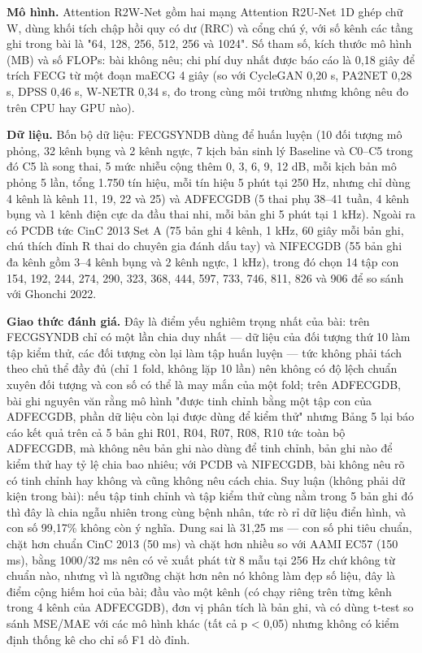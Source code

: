 \documentclass[12pt,a4paper]{article}
\begin{document}
\noindent \textbf{Mô hình.} Attention R2W-Net gồm hai mạng Attention R2U-Net 1D ghép chữ W, dùng khối tích chập hồi quy có dư (RRC) và cổng chú ý, với số kênh các tầng ghi trong bài là "64, 128, 256, 512, 256 và 1024". Số tham số, kích thước mô hình (MB) và số FLOPs: bài không nêu; chi phí duy nhất được báo cáo là 0,18 giây để trích FECG từ một đoạn maECG 4 giây (so với CycleGAN 0,20 s, PA2NET 0,28 s, DPSS 0,46 s, W-NETR 0,34 s, đo trong cùng môi trường nhưng không nêu đo trên CPU hay GPU nào).\par\vspace{3pt}
\noindent \textbf{Dữ liệu.} Bốn bộ dữ liệu: FECGSYNDB dùng để huấn luyện (10 đối tượng mô phỏng, 32 kênh bụng và 2 kênh ngực, 7 kịch bản sinh lý Baseline và C0–C5 trong đó C5 là song thai, 5 mức nhiễu cộng thêm 0, 3, 6, 9, 12 dB, mỗi kịch bản mô phỏng 5 lần, tổng 1.750 tín hiệu, mỗi tín hiệu 5 phút tại 250 Hz, nhưng chỉ dùng 4 kênh là kênh 11, 19, 22 và 25) và ADFECGDB (5 thai phụ 38–41 tuần, 4 kênh bụng và 1 kênh điện cực da đầu thai nhi, mỗi bản ghi 5 phút tại 1 kHz). Ngoài ra có PCDB tức CinC 2013 Set A (75 bản ghi 4 kênh, 1 kHz, 60 giây mỗi bản ghi, chú thích đỉnh R thai do chuyên gia đánh dấu tay) và NIFECGDB (55 bản ghi đa kênh gồm 3–4 kênh bụng và 2 kênh ngực, 1 kHz), trong đó chọn 14 tập con 154, 192, 244, 274, 290, 323, 368, 444, 597, 733, 746, 811, 826 và 906 để so sánh với Ghonchi 2022.\par\vspace{3pt}
\noindent \textbf{Giao thức đánh giá.} Đây là điểm yếu nghiêm trọng nhất của bài: trên FECGSYNDB chỉ có một lần chia duy nhất — dữ liệu của đối tượng thứ 10 làm tập kiểm thử, các đối tượng còn lại làm tập huấn luyện — tức không phải tách theo chủ thể đầy đủ (chỉ 1 fold, không lặp 10 lần) nên không có độ lệch chuẩn xuyên đối tượng và con số có thể là may mắn của một fold; trên ADFECGDB, bài ghi nguyên văn rằng mô hình "được tinh chỉnh bằng một tập con của ADFECGDB, phần dữ liệu còn lại được dùng để kiểm thử" nhưng Bảng 5 lại báo cáo kết quả trên cả 5 bản ghi R01, R04, R07, R08, R10 tức toàn bộ ADFECGDB, mà không nêu bản ghi nào dùng để tinh chỉnh, bản ghi nào để kiểm thử hay tỷ lệ chia bao nhiêu; với PCDB và NIFECGDB, bài không nêu rõ có tinh chỉnh hay không và cũng không nêu cách chia. Suy luận (không phải dữ kiện trong bài): nếu tập tinh chỉnh và tập kiểm thử cùng nằm trong 5 bản ghi đó thì đây là chia ngẫu nhiên trong cùng bệnh nhân, tức rò rỉ dữ liệu điển hình, và con số 99,17\% không còn ý nghĩa. Dung sai là 31,25 ms — con số phi tiêu chuẩn, chặt hơn chuẩn CinC 2013 (50 ms) và chặt hơn nhiều so với AAMI EC57 (150 ms), bằng 1000/32 ms nên có vẻ xuất phát từ 8 mẫu tại 256 Hz chứ không từ chuẩn nào, nhưng vì là ngưỡng chặt hơn nên nó không làm đẹp số liệu, đây là điểm cộng hiếm hoi của bài; đầu vào một kênh (có chạy riêng trên từng kênh trong 4 kênh của ADFECGDB), đơn vị phân tích là bản ghi, và có dùng t-test so sánh MSE/MAE với các mô hình khác (tất cả p < 0,05) nhưng không có kiểm định thống kê cho chỉ số F1 dò đỉnh.\par\vspace{3pt}
\end{document}
